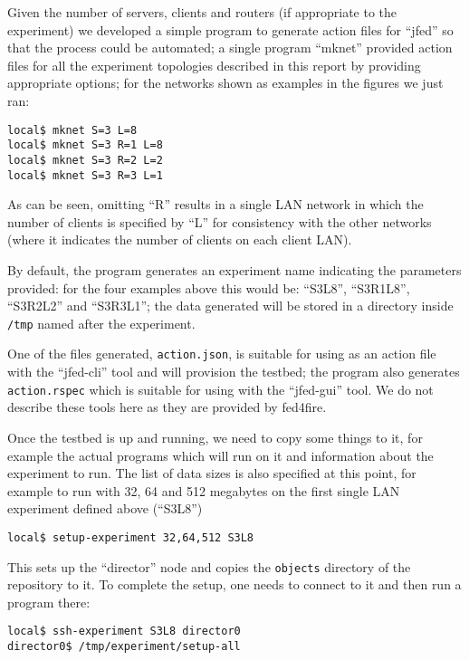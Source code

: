 \documentclass[a4paper,12pt]{article}
\begin{document}
Given the number of servers, clients and routers (if appropriate to the
experiment) we developed a simple program to generate action files
for ``jfed'' so that the process could be automated; a single program
``mknet'' provided action files for all the experiment topologies
described in this report by providing appropriate options; for the
networks shown as examples in the figures we just ran:

\begin{verbatim}
local$ mknet S=3 L=8
local$ mknet S=3 R=1 L=8
local$ mknet S=3 R=2 L=2
local$ mknet S=3 R=3 L=1
\end{verbatim}

As can be seen, omitting ``R'' results in a single LAN network in which
the number of clients is specified by ``L'' for consistency with the
other networks (where it indicates the number of clients on each client
LAN).

By default, the program generates an experiment name indicating the parameters
provided: for the four examples above this would be: ``S3L8'', ``S3R1L8'',
``S3R2L2'' and ``S3R3L1''; the data generated will be stored in a
directory inside {\tt/tmp} named after the experiment.

One of the files generated, {\tt action.json}, is suitable for using as
an action file with the ``jfed-cli'' tool and will provision the testbed;
the program also generates {\tt action.rspec} which is suitable for
using with the ``jfed-gui'' tool.  We do not describe these tools here
as they are provided by fed4fire.

Once the testbed is up and running, we need to copy some things to it,
for example the actual programs which will run on it and information about
the experiment to run.  The list of data sizes is also specified at
this point, for example to run with 32, 64 and 512 megabytes on the
first single LAN experiment defined above (``S3L8'')

\begin{verbatim}
local$ setup-experiment 32,64,512 S3L8
\end{verbatim}

This sets up the ``director'' node and copies the {\tt objects} directory
of the repository to it.  To complete the setup, one needs to connect to
it and then run a program there:

\begin{verbatim}
local$ ssh-experiment S3L8 director0
director0$ /tmp/experiment/setup-all
\end{verbatim}
\end{document}
